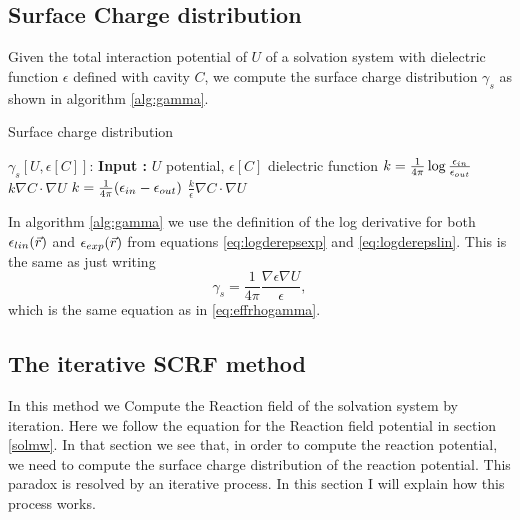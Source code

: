 \documentclass[../master_thesis.tex]{subfiles}
\begin{document}
\subsection{Surface Charge distribution}
Given the total interaction potential of $U$ of a solvation system with
dielectric function $\epsilon$ defined with cavity $C$, we compute the surface charge distribution
$\gamma_s$ as shown in algorithm \ref{alg:gamma}.
\begin{algorithm}
  \caption{Surface charge distribution}\label{alg:gamma}
  \begin{algorithmic}
    \STATE $\gamma_s[U, \epsilon[C]]$:
    \STATE \textbf{Input :} $U$ potential, $\epsilon[C]$ dielectric function
      \STATE $k = \frac{1}{4\pi}\log\frac{\epsilon_{in}}{\epsilon_{out}}$
      \RETURN $k \nabla C \cdot \nabla U$
      \STATE $k = \frac{1}{4\pi}(\epsilon_{in}-\epsilon_{out})$
      \RETURN $\frac{k}{\epsilon} \nabla C \cdot \nabla U$
    \ENDIF
  \end{algorithmic}
\end{algorithm}

In algorithm \ref{alg:gamma} we use the definition of the log derivative for both $\epsilon_{lin}(\vec{r})$ and $\epsilon_{exp}(\vec{r})$
from equations \ref{eq:logderepsexp} and \ref{eq:logderepslin}. This is the same
as just writing $$\gamma_s = \frac{1}{4\pi}\frac{\nabla\epsilon\nabla U}{\epsilon},$$
which is the same equation as in \ref{eq:effrhogamma}.

\subsection{The iterative \ac{SCRF} method}
In this method we Compute the Reaction field of the solvation system by iteration.
Here we follow the equation for the Reaction field potential in section \ref{solmw}.
In that section we see that, in order to compute the reaction potential, we need
to compute the surface charge distribution of the reaction potential. This
paradox is resolved by an iterative process. In this section I will explain how
this process works.
\end{document}
